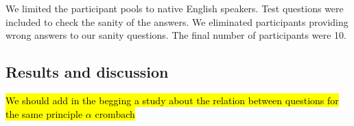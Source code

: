 \documentclass{llncs}
\begin{document}
	
	We limited the participant pools to native English speakers. Test questions were included to check the sanity of the answers. We eliminated participants providing wrong answers to our sanity questions. The final number of participants were 10. 
	
	\subsection{Results and discussion}
	\hl{We should add in the begging a study about the relation between questions for the same principle $\alpha$ crombach}
	
	
	
	
\vskip 4pt


\end{document}
